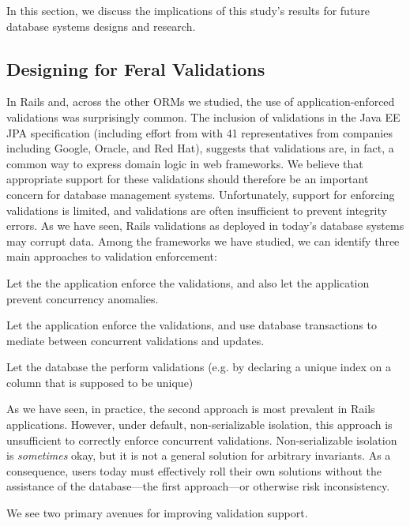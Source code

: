 In this section, we discuss the implications of this study's results
for future database systems designs and research.

\subsection{Designing for Feral Validations}

In Rails and, across the other ORMs we studied, the use of
application-enforced validations was surprisingly common. The
inclusion of validations in the Java EE JPA specification (including
effort from with 41 representatives from companies including Google,
Oracle, and Red Hat), suggests that validations are, in fact, a common
way to express domain logic in web frameworks. We believe that
appropriate support for these validations should therefore be an
important concern for database management systems. Unfortunately,
support for enforcing validations is limited, and validations are
often insufficient to prevent integrity errors. As we have seen, Rails
validations as deployed in today's database systems may corrupt
data. Among the frameworks we have studied, we can identify three main
approaches to validation enforcement:
\begin{defendenumerate}
\item Let the the application enforce the validations, and also let
  the application prevent concurrency anomalies.

\item Let the application enforce the validations, and use database
  transactions to mediate between concurrent validations and updates.

\item Let the database the perform validations (e.g. by declaring a unique
  index on a column that is supposed to be unique)
\end{defendenumerate}
As we have seen, in practice, the second approach is most prevalent in
Rails applications. However, under default, non-serializable
isolation, this approach is unsufficient to correctly enforce
concurrent validations. Non-serializable isolation is
\textit{sometimes} okay, but it is not a general solution for
arbitrary invariants. As a consequence, users today must effectively
roll their own solutions without the assistance of the database---the
first approach---or otherwise risk inconsistency.

We see two primary avenues for improving validation support.


